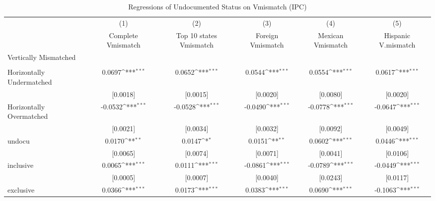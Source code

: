 \begin{table}[htbp]\centering
\def\sym#1{\ifmmode^{#1}\else\(^{#1}\)\fi}
\caption{Regressions of Undocumented Status on Vmismatch (IPC)}
\begin{tabular}{l*{5}{c}}
\toprule
                    &\multicolumn{1}{c}{(1)}         &\multicolumn{1}{c}{(2)}         &\multicolumn{1}{c}{(3)}         &\multicolumn{1}{c}{(4)}         &\multicolumn{1}{c}{(5)}         \\
                    &Complete Vmismatch         &Top 10 states Vmismatch         &Foreign Vmismatch         &Mexican Vmismatch         &Hispanic V.mismatch         \\
\midrule
Vertically Mismatched&                     &                     &                     &                     &                     \\
                    &                     &                     &                     &                     &                     \\
\addlinespace
Horizontally Undermatched&      0.0697\sym{***}&      0.0652\sym{***}&      0.0544\sym{***}&      0.0554\sym{***}&      0.0617\sym{***}\\
                    &    [0.0018]         &    [0.0015]         &    [0.0020]         &    [0.0080]         &    [0.0020]         \\
\addlinespace
Horizontally Overmatched&     -0.0532\sym{***}&     -0.0528\sym{***}&     -0.0490\sym{***}&     -0.0778\sym{***}&     -0.0647\sym{***}\\
                    &    [0.0021]         &    [0.0034]         &    [0.0032]         &    [0.0092]         &    [0.0049]         \\
\addlinespace
undocu              &      0.0170\sym{**} &      0.0147\sym{*}  &      0.0151\sym{**} &      0.0602\sym{***}&      0.0446\sym{***}\\
                    &    [0.0065]         &    [0.0074]         &    [0.0071]         &    [0.0041]         &    [0.0106]         \\
\addlinespace
inclusive           &      0.0065\sym{***}&      0.0111\sym{***}&     -0.0861\sym{***}&     -0.0789\sym{***}&     -0.0449\sym{***}\\
                    &    [0.0005]         &    [0.0007]         &    [0.0040]         &    [0.0243]         &    [0.0117]         \\
\addlinespace
exclusive           &      0.0366\sym{***}&      0.0173\sym{***}&      0.0383\sym{***}&      0.0690\sym{***}&     -0.1063\sym{***}\\

\end{tabular}
\end{table}
